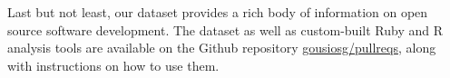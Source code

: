 \documentclass{sig-alternate}
\begin{document}
Last but not least, our dataset provides a rich body of information on open source software development. The dataset as well as custom-built Ruby and R analysis tools are available on the Github repository 
\href{https://github.com/gousiosg/pullreqs}{gousiosg/pullreqs}, along with instructions on how to use them.

%
%
%
%
%  
%
%
%
%
%
%



\balance

  
\end{document}
